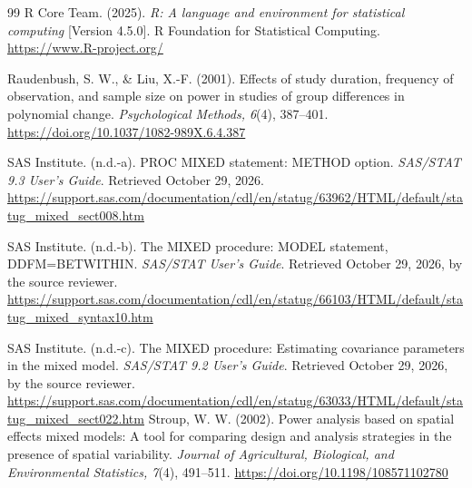 \begin{thebibliography}{99}
R Core Team. (2025). \emph{R: A language and environment for statistical computing}
[Version 4.5.0]. R Foundation for Statistical Computing.
\url{https://www.R-project.org/}

Raudenbush, S. W., \& Liu, X.-F. (2001).
Effects of study duration, frequency of observation, and sample size on power in studies of group differences in polynomial change.
\emph{Psychological Methods, 6}(4), 387--401.
\url{https://doi.org/10.1037/1082-989X.6.4.387}

SAS Institute. (n.d.-a). PROC MIXED statement: METHOD option.
\emph{SAS/STAT 9.3 User's Guide}. Retrieved October 29, 2026.
\url{https://support.sas.com/documentation/cdl/en/statug/63962/HTML/default/statug_mixed_sect008.htm}

SAS Institute. (n.d.-b). The MIXED procedure: MODEL statement, DDFM=BETWITHIN.
\emph{SAS/STAT User's Guide}. Retrieved October 29, 2026, by the source reviewer.
\url{https://support.sas.com/documentation/cdl/en/statug/66103/HTML/default/statug_mixed_syntax10.htm}

SAS Institute. (n.d.-c). The MIXED procedure: Estimating covariance parameters in the mixed model.
\emph{SAS/STAT 9.2 User's Guide}. Retrieved October 29, 2026, by the source reviewer.
\url{https://support.sas.com/documentation/cdl/en/statug/63033/HTML/default/statug_mixed_sect022.htm}
Stroup, W. W. (2002). Power analysis based on spatial effects mixed models:
A tool for comparing design and analysis strategies in the presence of spatial variability.
\emph{Journal of Agricultural, Biological, and Environmental Statistics, 7}(4), 491--511.
\url{https://doi.org/10.1198/108571102780}
\end{thebibliography}
